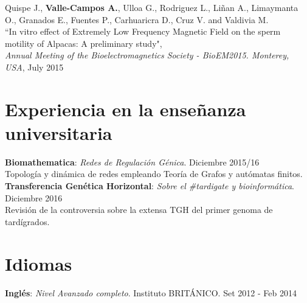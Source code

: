 \documentclass[margin,line]{res}
\begin{document}
\begin{resume}
		Quispe J., \textbf{Valle-Campos A.}, Ulloa G., Rodriguez L., Liñan A., Limaymanta O., Granados E., Fuentes P., Carhuaricra D., Cruz V. and Valdivia M.\\ ``In vitro effect of Extremely Low Frequency Magnetic Field on the sperm motility of Alpacas: A preliminary study", \\ {\em Annual Meeting of the Bioelectromagnetics Society - BioEM2015. Monterey, USA}, July 2015\\
		
		
		
		
		\section{\sc Experiencia en la enseñanza universitaria}
		{\bf Biomathematica}: {\em Redes de Regulación Génica}. \hfill {Diciembre 2015/16}\\ Topología y dinámica de redes empleando Teoría de Grafos y autómatas finitos. \\ %
		{\bf Transferencia Genética Horizontal}: {\em Sobre el \#tardigate y bioinformática}. \hfill {Diciembre 2016}\\ Revisión de la controversia sobre la extensa TGH del primer genoma de tardígrados.\\
		
		
		\section{\sc Idiomas}
		{\bf Inglés}: {\em Nivel Avanzado completo}. Instituto BRITÁNICO. \hfill {Set 2012 - Feb 2014} \\
		

\end{resume}
\end{document}
